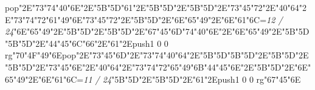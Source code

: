 pop{}\ipa\char"2E\ipa\char"73\ipa\char"74\ipa\char"40\ipa\char"6E\ipa\char"2E\ipa\char"5B\enskip\enskip\enskip\ipa\char"5D\bigskip\ipa\char"61\ipa\char"2E\ipa\char"5B\enskip\enskip\enskip\enskip\ipa\char"5D\ipa\char"2E\ipa\char"5B\enskip\enskip\ipa\char"5D\ipa\char"2E\ipa\char"73\ipa\char"45\ipa\char"72\ipa\char"2E\ipa\char"40\ipa\char"64\ipa\char"2E\ipa\char"73\ipa\char"74\ipa\char"72\ipa\char"61\ipa\char"49\ipa\char"6E\bigskip\ipa\char"73\ipa\char"45\ipa\char"72\ipa\char"2E\ipa\char"5B\enskip\enskip\ipa\char"5D\ipa\char"2E\ipa\char"6E\ipa\char"65\ipa\char"49\ipa\char"2E\ipa\char"6E\ipa\char"61\ipa\char"6C\bigskip\vfill\footline={\hfill\tenrm\it 12 / 24}\eject\null\vfill\ipa\char"6E\ipa\char"65\ipa\char"49\ipa\char"2E\ipa\char"5B\enskip\enskip\enskip\enskip\ipa\char"5D\ipa\char"2E\ipa\char"5B\enskip\ipa\char"5D\ipa\char"2E\ipa\char"67\ipa\char"45\ipa\char"6D\bigskip\ipa\char"74\ipa\char"40\ipa\char"6E\ipa\char"2E\ipa\char"6E\ipa\char"65\ipa\char"49\ipa\char"2E\ipa\char"5B\enskip\enskip\enskip\enskip\enskip\enskip\ipa\char"5D\bigskip\ipa\char"5B\enskip\enskip\ipa\char"5D\ipa\char"2E\ipa\char"44\ipa\char"45\ipa\char"6C\ipa\char"66\ipa\char"2E\ipa\char"61\ipa\char"2E\pdfcolorstack\match push{1 0 0 rg}\ipa\char"70\ipa\char"4F\ipa\char"49\ipa\char"6E\pdfcolorstack\match pop{}\ipa\char"2E\ipa\char"73\ipa\char"45\ipa\char"6D\ipa\char"2E\ipa\char"73\ipa\char"74\ipa\char"40\ipa\char"64\ipa\char"2E\ipa\char"5B\enskip\enskip\enskip\ipa\char"5D\bigskip\ipa\char"5B\enskip\ipa\char"5D\ipa\char"2E\ipa\char"5B\enskip\enskip\enskip\enskip\ipa\char"5D\ipa\char"2E\ipa\char"5B\enskip\enskip\ipa\char"5D\ipa\char"2E\ipa\char"73\ipa\char"45\ipa\char"6E\ipa\char"2E\ipa\char"40\ipa\char"64\ipa\char"2E\ipa\char"73\ipa\char"74\ipa\char"72\ipa\char"65\ipa\char"49\ipa\char"6B\bigskip\ipa\char"44\ipa\char"45\ipa\char"6E\ipa\char"2E\ipa\char"5B\enskip\enskip\ipa\char"5D\ipa\char"2E\ipa\char"6E\ipa\char"65\ipa\char"49\ipa\char"2E\ipa\char"6E\ipa\char"61\ipa\char"6C\bigskip\vfill\footline={\hfill\tenrm\it 11 / 24}\eject\null\vfill\ipa\char"5B\enskip\enskip\enskip\ipa\char"5D\ipa\char"2E\ipa\char"5B\enskip\enskip\enskip\enskip\ipa\char"5D\ipa\char"2E\ipa\char"61\ipa\char"2E\pdfcolorstack\match push{1 0 0 rg}\ipa\char"67\ipa\char"45\ipa\char"6E\pdfcolorstack\match 